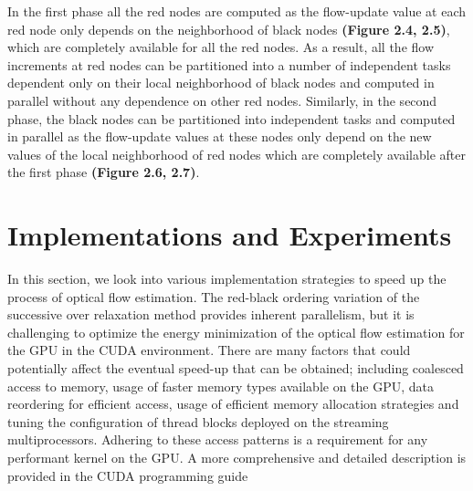 \documentclass[english]{article}
\begin{document}


	In the first phase all the red nodes are computed as the flow-update value at each red node only depends on the neighborhood of black nodes \textbf{(Figure 2.4, 2.5)}, which are completely available for all the red nodes. As a result, all the flow increments at red nodes can be partitioned into a number of independent tasks dependent only on their local neighborhood of black nodes and computed in parallel without any dependence on other red nodes. Similarly, in the second phase, the black nodes can be partitioned into independent tasks and computed in parallel as the flow-update values at these nodes only depend on the new values of the local neighborhood of red nodes which are completely available after the first phase \textbf{(Figure 2.6, 2.7)}. %

	\section{Implementations and Experiments}
	In this section, we look into various implementation strategies to speed up the process of optical flow estimation. The red-black ordering variation of the successive over relaxation method provides inherent parallelism, but it is challenging to optimize the energy minimization of the optical flow estimation for the GPU in the CUDA environment. There are many factors that could potentially affect the eventual speed-up that can be obtained; including coalesced access to memory, usage of faster memory types available on the GPU, data reordering for efficient access, usage of efficient memory allocation strategies and tuning the configuration of thread blocks deployed on the streaming multiprocessors. Adhering to these access patterns is a requirement for any performant kernel on the GPU. A more comprehensive and detailed description is provided in the CUDA programming guide \cite{11} 
\end{document}
